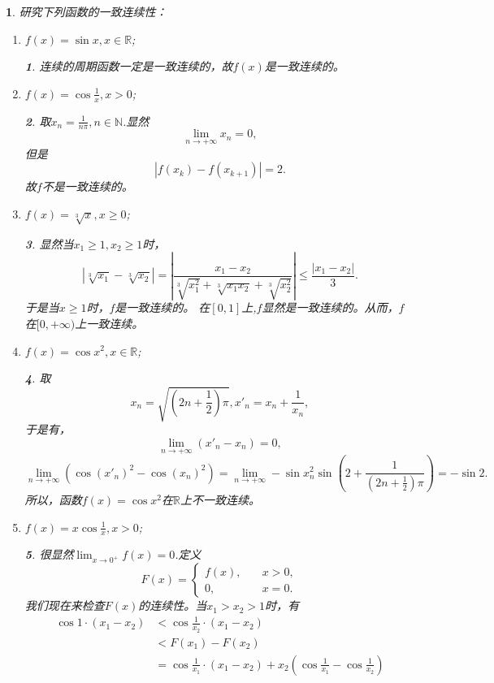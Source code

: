 \documentclass[utf8]{book}
\newtheorem{example}{}[section]             %
\newtheorem{solution}{}
\begin{document}
\begin{example}
研究下列函数的一致连续性：
\renewcommand\labelenumi{\normalfont(\theenumi)}
\begin{enumerate}
\item $f(x)=\sin{x}, x\in\mathbb{R}$;
\begin{solution}
连续的周期函数一定是一致连续的，故$f(x)$是一致连续的。
\end{solution}
\item $f(x)=\cos{\displaystyle\frac{1}{x}}, x > 0$;
\begin{solution}取$x_n=\displaystyle\frac{1}{n\pi}, n\in\mathbb{N}$.显然$$\displaystyle\lim_{n\to +\infty}x_n =0,$$ 但是$$|f(x_k) - f(x_{k+1})|=2.$$故$f$不是一致连续的。
\end{solution}
\item $f(x)=\sqrt[3]{x}, x\geq 0$;
\begin{solution}显然当$x_1\geq 1, x_2\geq 1$时，$$|\sqrt[3]{x_1}-\sqrt[3]{x_2}|=\left|\frac{x_1-x_2}{\sqrt[3]{x_1^2}+\sqrt[3]{x_1x_2}+\sqrt[3]{x^2_2}}\right|\leq \frac{|x_1-x_2|}{3}.$$
于是当$x\geq 1$时，$f$是一致连续的。
在$[0,1]$上,$f$显然是一致连续的。从而，$f$在$[0,+\infty)$上一致连续。
\end{solution}
\item $f(x)=\cos{x^2}, x\in\mathbb{R}$;
\begin{solution}取$$x_n=\sqrt{\left(2n+\frac{1}{2}\right)
\pi}, x'_n=x_n +\frac{1}{x_n},$$
于是有，$$\displaystyle\lim_{n\to +\infty}(x'_n-x_n)=0,$$
$$\displaystyle\lim_{n\to +\infty}(\cos{(x'_n)^2}-\cos{(x_n)^2})=\displaystyle\lim_{n\to +\infty}-\sin{x^2_n}\sin{\left(2+\frac{1}{(2n+\frac{1}{2})\pi}\right)}=-\sin{2}.$$
所以，函数$f(x)=\cos{x^2}$在$\mathbb{R}$上不一致连续。
\end{solution}
\item $f(x)=x\cos{\frac{1}{x}},x > 0$;
\begin{solution}很显然$\displaystyle\lim_{x\to 0^+}f(x) = 0$.定义
$$F(x)=
\begin{cases}
f(x), \quad&x > 0,\\
0, \quad&x =0.
\end{cases}$$
我们现在来检查$F(x)$的连续性。当$x_1 > x_2 > 1$时，有
\begin{equation*}
\begin{split}
\cos{1}\cdot(x_1-x_2) &< \cos{\frac{1}{x_2}}\cdot(x_1-x_2)\\&<
F(x_1)-F(x_2) \\&= \cos{\frac{1}{x_1}}\cdot(x_1-x_2) + x_2\left(\cos{\frac{1}{x_1}} -\cos{\frac{1}{x_2}}\right)\\

\end{split}
\end{equation*}
\end{solution}
\end{enumerate}
\end{example}
\end{document}
